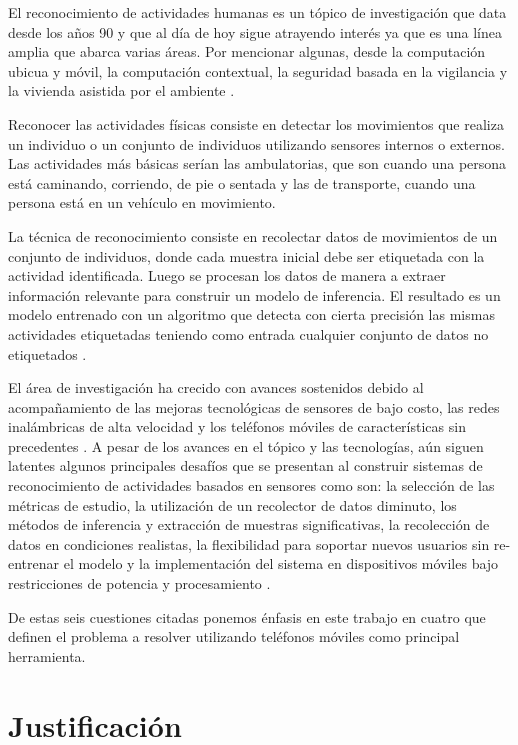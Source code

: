 \label{planteamiento}

El reconocimiento de actividades humanas es un tópico de investigación
que data desde los años 90 y que al día de hoy sigue atrayendo interés
ya que es una línea amplia que abarca varias áreas. Por mencionar
algunas, desde la computación ubicua y móvil, la computación contextual,
la seguridad basada en la vigilancia y la vivienda asistida por el
ambiente \cite{chen2012sensor}. 

Reconocer las actividades físicas consiste en detectar los movimientos
que realiza un individuo o un conjunto de individuos utilizando sensores
internos o externos. Las actividades más básicas serían las ambulatorias,
que son cuando una persona está caminando, corriendo, de pie o sentada
y las de transporte, cuando una persona está en un vehículo en movimiento.

La técnica de reconocimiento consiste en recolectar datos de movimientos
de un conjunto de individuos, donde cada muestra inicial debe ser
etiquetada con la actividad identificada. Luego se procesan los datos
de manera a extraer información relevante para construir un modelo
de inferencia. El resultado es un modelo entrenado con un algoritmo
que detecta con cierta precisión las mismas actividades etiquetadas
teniendo como entrada cualquier conjunto de datos no etiquetados \cite{Bao2004}.

El área de investigación ha crecido con avances sostenidos debido
al acompañamiento de las mejoras tecnológicas de sensores de bajo
costo, las redes inalámbricas de alta velocidad y los teléfonos móviles
de características sin precedentes \cite{chen2012sensor}. A pesar
de los avances en el tópico y las tecnologías, aún siguen latentes
algunos principales desafíos que se presentan al construir sistemas
de reconocimiento de actividades basados en sensores como son: la
selección de las métricas de estudio, la utilización de un recolector
de datos diminuto, los métodos de inferencia y extracción de muestras
significativas, la recolección de datos en condiciones realistas,
la flexibilidad para soportar nuevos usuarios sin re-entrenar el modelo
y la implementación del sistema en dispositivos móviles bajo restricciones
de potencia y procesamiento \cite{LaraLabrador2013}. 

De estas seis cuestiones citadas ponemos énfasis en este trabajo en
cuatro que definen el problema a resolver utilizando teléfonos móviles
como principal herramienta.

\section{Justificación}

